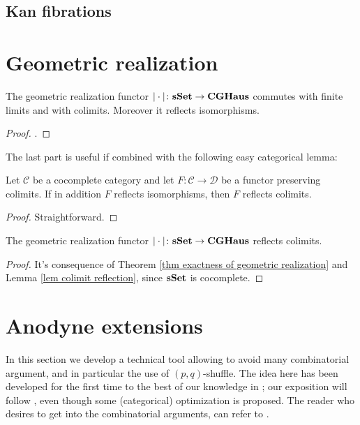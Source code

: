 \subsection{Kan fibrations}

\section{Geometric realization}

\begin{thm} \label{thm exactness of geometric realization}
The geometric realization functor $| \cdot | \colon \mathbf{sSet} \to \mathbf{CGHaus}$ commutes with finite limits and with colimits. Moreover it reflects isomorphisms.
\end{thm}

\begin{proof}
\cite[Ch. III.3]{gz}.
\end{proof}

The last part is useful if combined with the following easy categorical lemma:

\begin{lemma} \label{lem colimit reflection}
Let $\mathcal C$ be a cocomplete category and let $F \colon \mathcal C \to \mathcal D$ be a functor preserving colimits. If in addition $F$ reflects isomorphisms, then $F$ reflects colimits.
\end{lemma}

\begin{proof}
Straightforward.
\end{proof}

\begin{cor} \label{cor colimit in sset}
The geometric realization functor $| \cdot | \colon \mathbf{sSet} \to \mathbf{CGHaus}$ reflects colimits.
\end{cor}

\begin{proof}
It's consequence of Theorem \ref{thm exactness of geometric realization} and Lemma \ref{lem colimit reflection}, since $\mathbf{sSet}$ is cocomplete.
\end{proof}

\section{Anodyne extensions}

In this section we develop a technical tool allowing to avoid many combinatorial argument, and in particular the use of $(p,q)$-shuffle. The idea here has been developed for the first time to the best of our knowledge in \cite{gz}; our exposition will follow \cite[Ch. I.4]{gj}, even though some (categorical) optimization is proposed. The reader who desires to get into the combinatorial arguments, can refer to \cite{may}.

